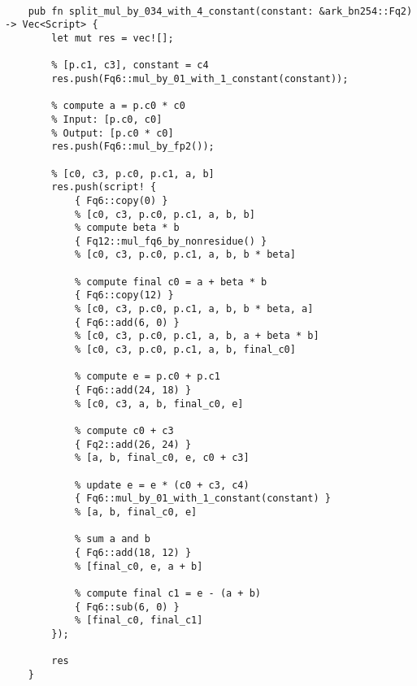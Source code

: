\begin{lstlisting}

    pub fn split_mul_by_034_with_4_constant(constant: &ark_bn254::Fq2) -> Vec<Script> {
        let mut res = vec![];

        % [p.c1, c3], constant = c4
        res.push(Fq6::mul_by_01_with_1_constant(constant));

        % compute a = p.c0 * c0
        % Input: [p.c0, c0]
        % Output: [p.c0 * c0]
        res.push(Fq6::mul_by_fp2());

        % [c0, c3, p.c0, p.c1, a, b]
        res.push(script! {
            { Fq6::copy(0) }
            % [c0, c3, p.c0, p.c1, a, b, b]
            % compute beta * b
            { Fq12::mul_fq6_by_nonresidue() }
            % [c0, c3, p.c0, p.c1, a, b, b * beta]

            % compute final c0 = a + beta * b
            { Fq6::copy(12) }
            % [c0, c3, p.c0, p.c1, a, b, b * beta, a]
            { Fq6::add(6, 0) }
            % [c0, c3, p.c0, p.c1, a, b, a + beta * b]
            % [c0, c3, p.c0, p.c1, a, b, final_c0]

            % compute e = p.c0 + p.c1
            { Fq6::add(24, 18) }
            % [c0, c3, a, b, final_c0, e]

            % compute c0 + c3
            { Fq2::add(26, 24) }
            % [a, b, final_c0, e, c0 + c3]

            % update e = e * (c0 + c3, c4)
            { Fq6::mul_by_01_with_1_constant(constant) }
            % [a, b, final_c0, e]

            % sum a and b
            { Fq6::add(18, 12) }
            % [final_c0, e, a + b]

            % compute final c1 = e - (a + b)
            { Fq6::sub(6, 0) }
            % [final_c0, final_c1]
        });

        res
    }

\end{lstlisting}